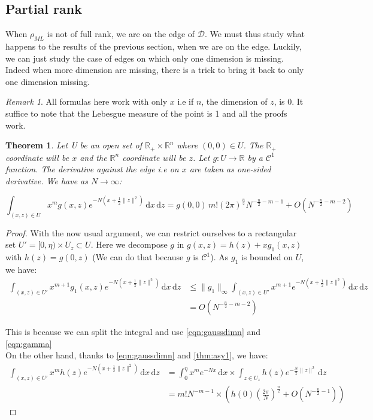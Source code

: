 \documentclass[10pt,a4paper]{report}
\theoremstyle{plain}
\newtheorem{thm}{Theorem}[chapter]
\theoremstyle{definition}
\theoremstyle{remark}
\newtheorem*{rem}{Remark}
\newcommand{\R}{\ensuremath{\mathbb{R}}}
\newcommand{\dd}{\mathrm{d}}
\renewcommand{\leq}{\leqslant}
\newcommand{\class}[1]{{\mathscr{C}^{#1}}}
\newcommand{\ml}{_{M\!L}}
\begin{document}
\subsection{Partial rank}

When $\rho\ml$ is not of full rank, we are on the edge of $\mathcal{D}$. We must
thus study what happens to the results of the previous section, when we are on
the edge. Luckily, we can just study the case of edges on which only one
dimension is missing. Indeed when more dimension are missing, there is a trick
to bring it back to only one dimension missing.

\begin{rem}
All formulas here work
with only $x$ i.e if $n$, the dimension of $z$, is 0. It suffice to note that the
Lebesgue measure of the point is 1 and all the proofs work.
\end{rem}

\begin{thm}\label{thm:asyp1}
  Let U be an open set of $\R_+ \times \R^n$ where $(0,0) \in U$. The $\R_+$
  coordinate will be $x$ and the $\R^n$ coordinate will be $z$. Let $g : U \to
  \R$ by a $\class 1$ function. The derivative against the edge i.e on $x$ are
  taken as one-sided derivative. We have as $N \to \infty$:

  \[\int_{(x,z) \in U} x^m g(x,z)e^{-N(x + \frac 12 \|z\|^2)} \,\dd x\, \dd z =
    g(0,0)\,m! {(2\pi)}^{\frac n 2} N^{-\frac n 2 - m - 1} + O(N^{-\frac n 2 - m - 2})\]
\end{thm}

\begin{proof} With the now usual argument, we can restrict ourselves to a
  rectangular set $U' = [0,\eta) \times U_z \subset U$.
  Here we decompose $g$ in $g(x,z) = h(z) + x g_1(x,z)$ with $h(z) = g(0,z)$ (We
  can do that because $g$ is $\class 1$). As
  $g_1$ is bounded on $U$, we have:
\begin{align*}
  \int_{(x,z) \in U'} x^{m+1}g_1(x,z)e^{-N(x + \frac 12 \|z\|^2)} \,\dd x\, \dd z
  &\leq
  \|g_1\|_\infty\int_{(x,z) \in U'} x^{m+1}e^{-N(x + \frac 12 \|z\|^2)} \,\dd x\, \dd z\\
    &=O(N^{-\frac n 2 - m - 2})
\end{align*}

This is because we can split the integral and use \cref{eqn:gaussdimn} and \cref{eqn:gamma}\\
On the other hand, thanks to \cref{eqn:gaussdimn} and \cref{thm:asy1}, we have:
\begin{align*}
  \int_{(x,z) \in U'} x^{m}h(z)e^{-N(x + \frac 12 \|z\|^2)} \,\dd x\, \dd z
  &= \int_0^\eta x^{m}e^{-Nx} \,\dd x \times
    \int_{z \in U_z} h(z)e^{-\frac N2 \|z\|^2} \, \dd z\\
  &= m! N^{-m-1} \times( h(0){\left(\frac
      {2\pi}{N}\right)}^{\frac n 2} +
    O\left({N^{-\frac n 2 -1}}\right))
\end{align*}

\end{proof}
\end{document}

